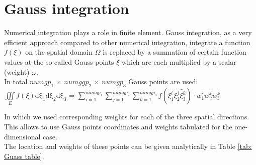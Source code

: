 \documentclass{article}
\begin{document}
\section{Gauss integration}
Numerical integration plays a role in finite element. Gauss integration, as a very efficient approach compared to other numerical integration, integrate a function $f(\xi)$ on the spatial domain $\Omega$ is replaced by a summation of certain function values at the so-called Gauss points $\tilde{\xi}$ which are each multiplied by a scalar (weight) $\omega$.\\

In total $numgp_1$ $\times$ $numggp_2$ $\times$ $numgp_3$ Gauss points are used: \\

$\iiint \limits_E f\left(\xi\right) \mathrm{d\xi_1}\mathrm{d\xi_2}\mathrm{d\xi_3}$ = $\displaystyle\sum_{i=1}^{numgp_1}\displaystyle\sum_{j=1}^{numgp_2} \displaystyle\sum_{k=1}^{numgp_3} f\left(\tilde{\xi_1^i}\tilde{\xi_2^j}\tilde{\xi_3^k}\right)\cdot w_1^i w_2^j w_3^k$ \newline

In which we used corresponding weights for each of the three spatial directions. This allows to use Gauss points coordinates and weights tabulated for the one-dimensional case. \\

The location and weights of these points can be given analytically in Table \ref{tab: Guass table}.
\end{document}
